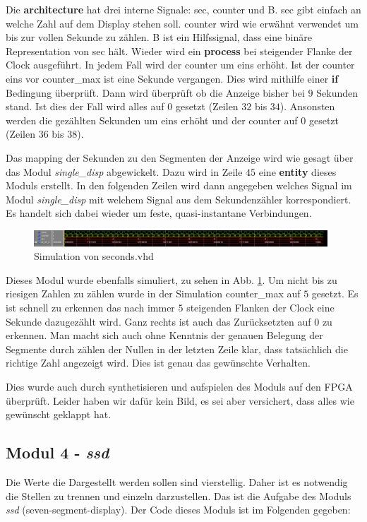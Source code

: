 Die \textbf{architecture} hat drei interne Signale: sec, counter und B.
sec gibt einfach an welche Zahl auf dem Display stehen soll.
counter wird wie erwähnt verwendet um bis zur vollen Sekunde zu zählen.
B ist ein Hilfssignal, dass eine binäre Representation von sec hält.
Wieder wird ein \textbf{process} bei steigender Flanke der Clock ausgeführt.
In jedem Fall wird der counter um eins erhöht.
Ist der counter eins vor counter\_max ist eine Sekunde vergangen.
Dies wird mithilfe einer \textbf{if} Bedingung überprüft.
Dann wird überprüft ob die Anzeige bisher bei $9$ Sekunden stand.
Ist dies der Fall wird alles auf $0$ gesetzt (Zeilen $32$ bis $34$).
Ansonsten werden die gezählten Sekunden um eins erhöht und der counter auf $0$ gesetzt (Zeilen $36$ bis $38$).

Das mapping der Sekunden zu den Segmenten der Anzeige wird wie gesagt über das Modul \textit{single\_disp} abgewickelt.
Dazu wird in Zeile $45$ eine \textbf{entity} dieses Moduls erstellt.
In den folgenden Zeilen wird dann angegeben welches Signal im Modul \textit{single\_disp} mit welchem Signal aus dem Sekundenzähler korrespondiert.
Es handelt sich dabei wieder um feste, quasi-instantane Verbindungen.

\begin{figure}[ht]
	\centering
    \includegraphics[width=0.98\textwidth]{../Daten/seconds2.png}
	\caption{Simulation von seconds.vhd}
	\label{img_seconds}
\end{figure}

Dieses Modul wurde ebenfalls simuliert, zu sehen in Abb. \ref{img_seconds}.
Um nicht bis zu riesigen Zahlen zu zählen wurde in der Simulation counter\_max auf $5$ gesetzt.
Es ist schnell zu erkennen das nach immer $5$ steigenden Flanken der Clock eine Sekunde dazugezählt wird.
Ganz rechts ist auch das Zurücksetzten auf $0$ zu erkennen.
Man macht sich auch ohne Kenntnis der genauen Belegung der Segmente durch zählen der Nullen in der letzten Zeile klar, dass tatsächlich die richtige Zahl angezeigt wird.
Dies ist genau das gewünschte Verhalten.

Dies wurde auch durch synthetisieren und aufspielen des Moduls auf den FPGA überprüft.
Leider haben wir dafür kein Bild, es sei aber versichert, dass alles wie gewünscht geklappt hat.

\subsection{Modul 4 - \textit{ssd}}
Die Werte die Dargestellt werden sollen sind vierstellig.
Daher ist es notwendig die Stellen zu trennen und einzeln darzustellen.
Das ist die Aufgabe des Moduls \textit{ssd} (seven-segment-display). Der Code dieses Moduls ist im Folgenden gegeben:

